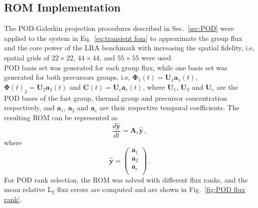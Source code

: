 \documentclass[review,number,sort&compress,12pt]{elsarticle}
\begin{document}


\subsection{ROM Implementation}

The POD-Galerkin projection procedures described in Sec.~\ref{sec:POD} were applied to the system in Eq.~\ref{eq:transient fom} to approximate the group flux and the core power of the LRA benchmark with increasing the spatial fidelity, i.e, spatial grids of $22\times 22$, $44\times44$, and $55 \times 55$ were used.\\
POD basis set was generated for each group flux, 
while one basis set was generated for both precursors groups, i.e, 
$\mathbf{\Phi}_1(t) = \mathbf{U}_1\mathbf{a}_1(t)$, $\mathbf{\Phi}(t)_2 = \mathbf{U}_2\mathbf{a}_2(t)$ and $\mathbf{C}(t) = \mathbf{U}_c\mathbf{a}_c(t)$, where $\mathbf{U}_1$, $\mathbf{U}_2$  and $\mathbf{U}_c$ are the POD bases of the fast group, thermal group and precursor concentration respectively, and $\mathbf{a}_1$, $\mathbf{a}_2$ and $\mathbf{a}_c$ are their respective temporal coefficients. 
The resulting ROM can be represented as 
\begin{equation}
\frac{d\mathbf{\hat{y}}}{dt} = \mathbf{A}_r\mathbf{\hat{y}}\, , 
\label{eq:ROM}
\end{equation}
where
\begin{equation*}
\mathbf{\hat{y}} = \begin{pmatrix}
\mathbf{a}_1\\
\mathbf{a}_2 \\
\mathbf{a}_c \\
\end{pmatrix} \,.
\end{equation*}
For POD rank selection, the ROM was solved with different flux ranks, and the mean relative L$_2$ flux errors are computed and are shown in Fig.~\ref{fig:POD flux rank}.
\end{document}
